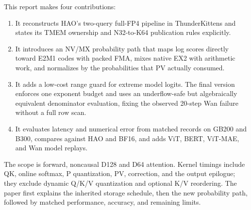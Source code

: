 This report makes four contributions:
\begin{enumerate}
  \item It reconstructs HAO's two-query full-FP4 pipeline in ThunderKittens
  and states its TMEM ownership and N32-to-K64 publication rules explicitly.

  \item It introduces an NV/MX probability path that maps log scores directly
  toward E2M1 codes with packed FMA, mixes native EX2 with arithmetic work,
  and normalizes by the probabilities that PV actually consumed.

  \item It adds a low-cost range guard for extreme model logits. The final
  version enforces one exponent budget and uses an underflow-safe but
  algebraically equivalent denominator evaluation, fixing the observed
  20-step Wan failure without a full row scan.

  \item It evaluates latency and numerical error from matched records on
  GB200 and B300, compares against HAO and BF16, and adds ViT, BERT, ViT-MAE,
  and Wan model replays.
\end{enumerate}

The scope is forward, noncausal D128 and D64 attention. Kernel timings include
QK, online softmax, P quantization, PV, correction, and the output epilogue;
they exclude dynamic Q/K/V quantization and optional K/V reordering. The
paper first explains the inherited storage schedule, then the new probability
path, followed by matched performance, accuracy, and remaining limits.
